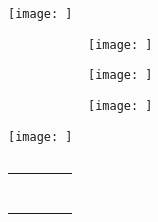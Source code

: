 
{\hfill\texttt{[image: ]}\hfill}


\begin{figure}%
	\centering
	\begin{subfigure}[b]{1\textwidth}
		\texttt{[image: ]}
		\subcaption{}\label{fig:}
	\end{subfigure}
	\qquad
	\begin{subfigure}[b]{1\textwidth}
		\texttt{[image: ]}
		\subcaption{}\label{fig:}
	\end{subfigure}
	\bigskip
	
	\begin{subfigure}[b]{1\textwidth}
		\texttt{[image: ]}
		\subcaption{}\label{fig:}
	\end{subfigure}
	\caption{}\label{fig:}
\end{figure}


\begin{SCfigure}%
	\centering
	\texttt{[image: ]}
	\caption{}\label{fig:}
\end{SCfigure}


\begin{table}%
	\caption{ }
	\begin{center}
	\begin{tabular}{p{4cm}|c|c|c|}
	\hline
	\rule[0ex]{-4pt}{3ex}
	\multirow{2}{*}{text}
	\end{tabular}
	\end{center}
\end{table}
